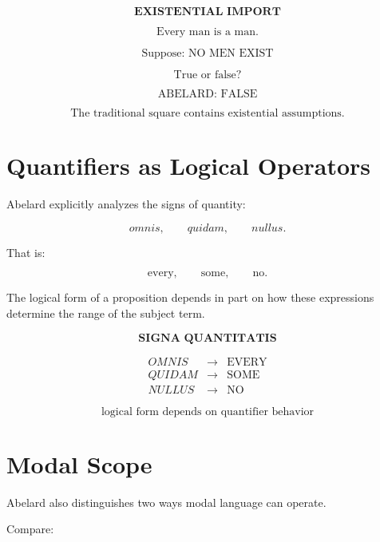 \documentclass[11pt]{article}
\newcommand{\latin}[1]{\textit{#1}}
\begin{document}
\begin{whiteboard}
\[
\textbf{EXISTENTIAL IMPORT}
\]

\[
\text{Every man is a man.}
\]

\[
\text{Suppose: NO MEN EXIST}
\]

\[
\text{True or false?}
\]

\[
\boxed{\text{ABELARD: FALSE}}
\]

\[
\text{The traditional square contains existential assumptions.}
\]
\end{whiteboard}

\section{Quantifiers as Logical Operators}

Abelard explicitly analyzes the signs of quantity:

\[
\latin{omnis},
\qquad
\latin{quidam},
\qquad
\latin{nullus}.
\]

That is:

\[
\text{every},
\qquad
\text{some},
\qquad
\text{no}.
\]

The logical form of a proposition depends in part on how these
expressions determine the range of the subject term.

\begin{whiteboard}
\[
\textbf{SIGNA QUANTITATIS}
\]

\[
\begin{array}{rcl}
\latin{OMNIS} &\rightarrow& \text{EVERY}\\
\latin{QUIDAM} &\rightarrow& \text{SOME}\\
\latin{NULLUS} &\rightarrow& \text{NO}
\end{array}
\]

\[
\boxed{\text{logical form depends on quantifier behavior}}
\]
\end{whiteboard}

\section{Modal Scope}

Abelard also distinguishes two ways modal language can operate.

Compare:
\end{document}
